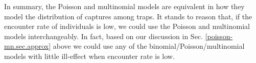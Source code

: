 In summary, the Poisson and multinomial models are equivalent in how
they model the distribution of captures among traps.
 It stands to reason that, if the encounter
rate of individuals is low, we could use the Poisson and multinomial
models interchangeably. In fact, based on our discussion in Sec.
\ref{poisson-mn.sec.approx}
above we could use any of the binomial/Poisson/multinomial models with
little ill-effect when encounter rate is low.





